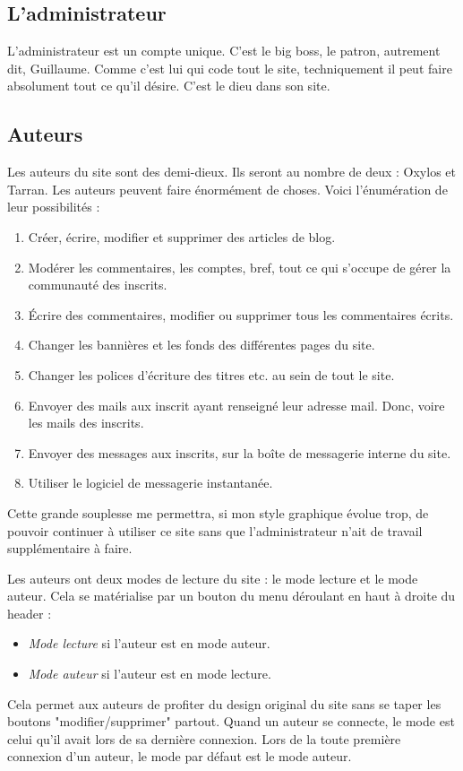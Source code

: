 \documentclass[french]{report}
\theoremstyle{plain}
\begin{document}
		\subsection{L'administrateur}
			L'administrateur est un compte unique. C'est le big boss, le patron, autrement dit, Guillaume. Comme c'est lui qui code tout le site, techniquement il peut faire absolument tout ce qu'il désire. C'est le dieu dans son site.

		\subsection{Auteurs} \label{auteurs}
			Les auteurs du site sont des demi-dieux. Ils seront au nombre de deux : Oxylos et Tarran. Les auteurs peuvent faire énormément de choses. Voici l'énumération de leur possibilités :
			\begin{enumerate}
				\item Créer, écrire, modifier et supprimer des articles de blog.
				\item Modérer les commentaires, les comptes, bref, tout ce qui s'occupe de gérer la communauté des inscrits.
				\item Écrire des commentaires, modifier ou supprimer tous les commentaires écrits.
				\item Changer les bannières et les fonds des différentes pages du site.
				\item Changer les polices d'écriture des titres etc. au sein de tout le site. 
				\item Envoyer des mails aux inscrit ayant renseigné leur adresse mail. Donc, voire les mails des inscrits.
				\item Envoyer des messages aux inscrits, sur la boîte de messagerie interne du site.
				\item Utiliser le logiciel de messagerie instantanée.
			\end{enumerate}
			Cette grande souplesse me permettra, si mon style graphique évolue trop, de pouvoir continuer à utiliser ce site sans que l'administrateur n'ait de travail supplémentaire à faire.

			Les auteurs ont deux modes de lecture du site : le mode lecture et le mode auteur. Cela se matérialise par un bouton du menu déroulant en haut à droite du header :
			\begin{itemize}
				\item \emph{Mode lecture} si l'auteur est en mode auteur.
				\item \emph{Mode auteur} si l'auteur est en mode lecture.
			\end{itemize}
			Cela permet aux auteurs de profiter du design original du site sans se taper les boutons "modifier/supprimer" partout. Quand un auteur se connecte, le mode est celui qu'il avait lors de sa dernière connexion. Lors de la toute première connexion d'un auteur, le mode par défaut est le mode auteur.
\end{document}
